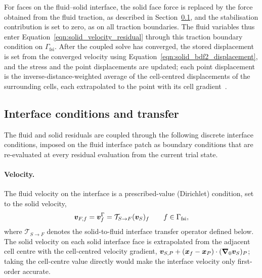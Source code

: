 For faces on the fluid--solid interface, the solid face force is replaced by the force obtained from the fluid traction, as described in Section~\ref{sec:interface_conditions}, and the stabilisation contribution is set to zero, as on all traction boundaries.
The fluid variables thus enter Equation~\eqref{eqn:solid_velocity_residual} through this traction boundary condition on $\Gamma_\mathrm{fsi}$.
After the coupled solve has converged, the stored displacement is set from the converged velocity using Equation~\eqref{eqn:solid_bdf2_displacement}, and the stress and the point displacements are updated; each point displacement is the inverse-distance-weighted average of the cell-centred displacements of the surrounding cells, each extrapolated to the point with its cell gradient~\citep{Tukovic2007}.

\subsection{Interface conditions and transfer}
\label{sec:interface_conditions}

The fluid and solid residuals are coupled through the following discrete interface conditions, imposed on the fluid interface patch as boundary conditions that are re-evaluated at every residual evaluation from the current trial state.

\paragraph{Velocity.}
The fluid velocity on the interface is a prescribed-value (Dirichlet) condition, set to the solid velocity,
\begin{equation}
    \boldsymbol{v}_{F,f}
    =
    \boldsymbol{v}^{\Gamma}_f
    =
    \mathcal{T}_{S\to F}(\boldsymbol{v}_S)_f
    \qquad
    f \in \Gamma_\mathrm{fsi},
    \label{eqn:mapped_solid_velocity}
\end{equation}
where $\mathcal{T}_{S\to F}$ denotes the solid-to-fluid interface transfer operator defined below.
The solid velocity on each solid interface face is extrapolated from the adjacent cell centre with the cell-centred velocity gradient, $\boldsymbol{v}_{S,P} + (\boldsymbol{x}_f - \boldsymbol{x}_P)\cdot(\boldsymbol{\nabla}_0\boldsymbol{v}_S)_P$; taking the cell-centre value directly would make the interface velocity only first-order accurate.

